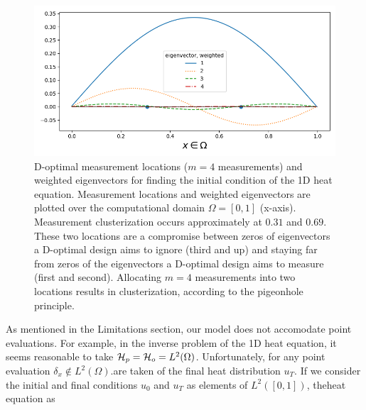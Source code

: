 \begin{figure}\label{fig:eigenvectors}
    \centering
    \includegraphics[width=\textwidth]{eigenvectors_dst_scaled.png}
    \caption{D-optimal measurement locations ($m=4$ measurements) and
      weighted eigenvectors for finding the initial condition of
      the 1D heat equation. Measurement locations and weighted
      eigenvectors are plotted over the computational domain $\Omega =
      [0, 1]$ (x-axis). Measurement clusterization occurs
      approximately at $0.31$ and $0.69$. These two locations are a
      compromise between zeros of eigenvectors a D-optimal design aims
      to ignore (third and up) and staying far from zeros of the
      eigenvectors a D-optimal design aims to measure (first and
      second). Allocating $m=4$ measurements into two locations
      results in clusterization, according to the pigeonhole
      principle.}
  \label{fig:why}
\end{figure}


As mentioned in the Limitations section, our model does not accomodate
point evaluations. For example, in the inverse problem of the 1D heat
equation, it seems reasonable to take $\mathcal{H}_p = \mathcal{H}_o =
L^2(\Omega)$. Unfortunately, for any point evaluation $\delta_x \not
\in L^2(\Omega)$.are taken of the final heat distribution $u_T$. If we
consider the initial and final conditions $u_0$ and $u_T$ as elements
of $L^2([0,1])$, theheat equation as
